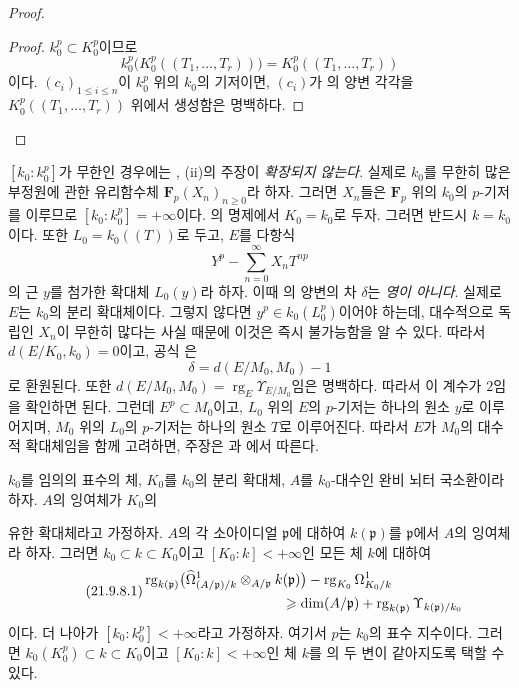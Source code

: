 \begin{proof}
\begin{enumerate}
  \begin{proof}
  $k_0^p\subset K_0^p$이므로
  \[
    k_0^p\bigl(K_0^p((T_1,\ldots,T_r))\bigr)
    =K_0^p((T_1,\ldots,T_r))
  \]
  이다. $(c_i)_{1\leqslant i\leqslant n}$이 $k_0^p$ 위의 $k_0$의
  기저이면, $(c_i)$가 의 양변 각각을
  $K_0^p((T_1,\ldots,T_r))$ 위에서 생성함은 명백하다.
  \end{proof}
\end{enumerate}
\end{proof}

\begin{remark}[21.9.7]
\label{0.21.9.7-ko}
$[k_0:k_0^p]$가 무한인 경우에는 , (ii)의 주장이
\emph{확장되지 않는다}. 실제로 $k_0$를 무한히 많은 부정원에 관한
유리함수체 $\mathbf F_p(X_n)_{n\geqslant0}$라 하자. 그러면 $X_n$들은
$\mathbf F_p$ 위의 $k_0$의 $p$-기저를 이루므로
$[k_0:k_0^p]=+\infty$이다. 의 명제에서
$K_0=k_0$로 두자. 그러면 반드시 $k=k_0$이다. 또한
$L_0=k_0((T))$로 두고, $E$를 다항식
\[
  Y^p-\sum_{n=0}^{\infty}X_nT^{np}
\]
의 근 $y$를 첨가한 확대체 $L_0(y)$라 하자. 이때
의 양변의 차 $\delta$는 \emph{영이 아니다}.
실제로 $E$는 $k_0$의 분리 확대체이다. 그렇지 않다면
$y^p\in k_0(L_0^p)$이어야 하는데, 대수적으로 독립인 $X_n$이 무한히
많다는 사실 때문에 이것은 즉시 불가능함을 알 수 있다. 따라서
$d(E/K_0,k_0)=0$이고, 공식 은
\[
  \delta=d(E/M_0,M_0)-1
\]
로 환원된다. 또한
$d(E/M_0,M_0)=\operatorname{rg}_E\Upsilon_{E/M_0}$임은 명백하다.
따라서 이 계수가 $2$임을 확인하면 된다. 그런데 $E^p\subset M_0$이고,
$L_0$ 위의 $E$의 $p$-기저는 하나의 원소 $y$로 이루어지며, $M_0$
위의 $L_0$의 $p$-기저는 하나의 원소 $T$로 이루어진다. 따라서 $E$가
$M_0$의 대수적 확대체임을 함께 고려하면, 주장은
과 에서 따른다.
\end{remark}

\begin{proposition}[21.9.8]
\label{0.21.9.8-ko}
$k_0$를 임의의 표수의 체, $K_0$를 $k_0$의 분리 확대체, $A$를
$k_0$-대수인 완비 뇌터 국소환이라 하자. $A$의 잉여체가 $K_0$의

유한 확대체라고 가정하자. $A$의 각 소아이디얼 $\mathfrak p$에 대하여
$k(\mathfrak p)$를 $\mathfrak p$에서 $A$의 잉여체라 하자. 그러면
$k_0\subset k\subset K_0$이고 $[K_0:k]<+\infty$인 모든 체 $k$에
대하여
\begin{equation}
\tag{21.9.8.1}
\label{0.21.9.8.1-ko}
\begin{split}
  &\operatorname{rg}_{k(\mathfrak p)}
    \bigl(\widehat\Omega^1_{(A/\mathfrak p)/k}
      \otimes_{A/\mathfrak p}k(\mathfrak p)\bigr)
    -\operatorname{rg}_{K_0}\Omega^1_{K_0/k}\\
  &\hspace{35mm}\geqslant
    \dim(A/\mathfrak p)
    +\operatorname{rg}_{k(\mathfrak p)}\Upsilon_{k(\mathfrak p)/k_0}
\end{split}
\end{equation}
이다. 더 나아가 $[k_0:k_0^p]<+\infty$라고 가정하자. 여기서 $p$는
$k_0$의 표수 지수이다. 그러면
$k_0(K_0^p)\subset k\subset K_0$이고 $[K_0:k]<+\infty$인 체 $k$를
의 두 변이 같아지도록 택할 수 있다.
\end{proposition}

